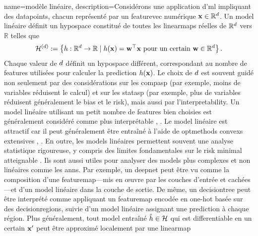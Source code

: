 {name={modèle linéaire}, 
	description={Considérons une application d'\gls{ml} impliquant des \glspl{datapoint}, chacun représenté 
		par un \gls{featurevec} numérique ${\bf x} \in \mathbb{R}^{d}$. Un \gls{model} linéaire définit 
		un \gls{hypospace} constitué de toutes les \glspl{linearmap} réelles de $\mathbb{R}^{d}$ vers $\mathbb{R}$ telles que
		\begin{equation}
			\label{equ_def_lin_model_hypspace_dict}
			\mathcal{H}^{(d)} := \left\{ h: \mathbb{R}^{d} \rightarrow \mathbb{R} \mid h({\bf x}) = {\bf w}^{\top} {\bf x} \text{ pour un certain } {\bf w} \in \mathbb{R}^{d} \right\}.
		\end{equation}
		Chaque valeur de $d$ définit un \gls{hypospace} différent, correspondant au nombre de 
		\glspl{feature} utilisées pour calculer la \gls{prediction} $h({\bf x})$. Le choix de 
		$d$ est souvent guidé non seulement par des considérations sur les \gls{compasp} (par exemple, moins de variables réduisent le calcul) et sur les 
		\gls{statasp} (par exemple, plus de variables réduisent généralement le \gls{bias} et le \gls{risk}), mais aussi par l'\gls{interpretability}. 
		Un \gls{model} linéaire utilisant un petit nombre de \glspl{feature} bien choisies est généralement considéré 
		comme plus interprétable \cite{rudin2019stop}, \cite{Ribeiro2016}.
		Le \gls{model} linéaire est attractif car il peut généralement être entraîné à l’aide de \glspl{optmethod} \glspl{convex} extensives \cite{hastie01statisticallearning}, \cite{BertsekasNonLinProgr}. 
		En outre, les \glspl{model} linéaires permettent souvent une analyse 
		statistique rigoureuse, y compris des limites fondamentales sur le \gls{risk} minimal atteignable \cite{Wain2019}. 
		Ils sont aussi utiles pour analyser des \glspl{model} plus complexes et non linéaires comme les \glspl{ann}. Par exemple, 
		un \gls{deepnet} peut être vu comme la composition d’une \gls{featuremap}—mis en œuvre par les couches d’entrée et 
		cachées—et d’un \gls{model} linéaire dans la couche de sortie. De même, un \gls{decisiontree} peut être interprété 
		comme appliquant un \gls{featuremap} encodée en one-hot basée sur des \glspl{decisionregion}, suivie d’un \gls{model} linéaire 
		assignant une \gls{prediction} à chaque région.
		Plus généralement, tout \gls{model} entraîné $\hat{h} \in \mathcal{H}$ qui est 
		\gls{differentiable} en un certain ${\bf x}'$ peut être approximé localement par une \gls{linearmap} 
}}
